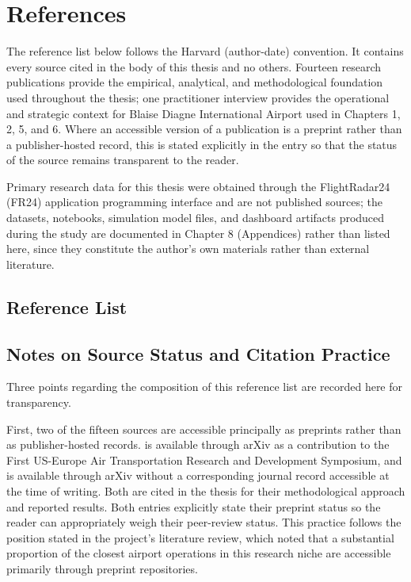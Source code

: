 \chapter{References}
\label{chap:references}

The reference list below follows the Harvard (author-date) convention. It contains every source cited in the body of this thesis and no others. Fourteen research publications provide the empirical, analytical, and methodological foundation used throughout the thesis; one practitioner interview provides the operational and strategic context for Blaise Diagne International Airport used in Chapters 1, 2, 5, and 6. Where an accessible version of a publication is a preprint rather than a publisher-hosted record, this is stated explicitly in the entry so that the status of the source remains transparent to the reader.

Primary research data for this thesis were obtained through the FlightRadar24 (FR24) application programming interface and are not published sources; the datasets, notebooks, simulation model files, and dashboard artifacts produced during the study are documented in Chapter 8 (Appendices) rather than listed here, since they constitute the author’s own materials rather than external literature.

\section{Reference List}
\label{sec:reference-list}

\printbibliography[heading=none]

\section{Notes on Source Status and Citation Practice}
\label{sec:source-status-citation-practice}

Three points regarding the composition of this reference list are recorded here for transparency.

First, two of the fifteen sources are accessible principally as preprints rather than as publisher-hosted records. \textcite{cao2025robust} is available through arXiv as a contribution to the First US-Europe Air Transportation Research and Development Symposium, and \textcite{zhu2024spatiotemporal} is available through arXiv without a corresponding journal record accessible at the time of writing. Both are cited in the thesis for their methodological approach and reported results. Both entries explicitly state their preprint status so the reader can appropriately weigh their peer-review status. This practice follows the position stated in the project’s literature review, which noted that a substantial proportion of the closest airport operations in this research niche are accessible primarily through preprint repositories.

